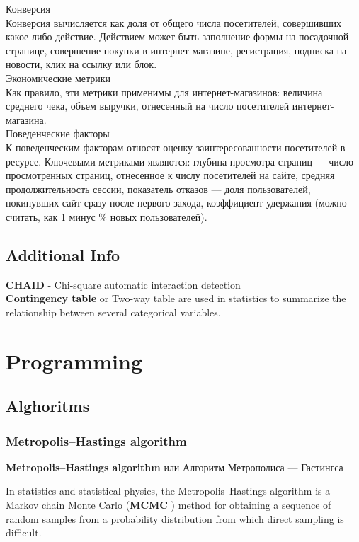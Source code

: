 \documentclass{book}
\begin{document}
Конверсия\\

Конверсия вычисляется как доля от общего числа посетителей, совершивших какое-либо действие. Действием может быть заполнение формы на посадочной странице, совершение покупки в интернет-магазине, регистрация, подписка на новости, клик на ссылку или блок.\\

Экономические метрики\\

Как правило, эти метрики применимы для интернет-магазинов: величина среднего чека, объем выручки, отнесенный на число посетителей интернет-магазина.\\

Поведенческие факторы\\

К поведенческим факторам относят оценку заинтересованности посетителей в ресурсе. Ключевыми метриками являются: глубина просмотра страниц — число просмотренных страниц, отнесенное к числу посетителей на сайте, средняя продолжительность сессии, показатель отказов — доля пользователей, покинувших сайт сразу после первого захода, коэффициент удержания (можно считать, как 1 минус \% новых пользователей).\\

\chapter{Additional Info}
\textbf{CHAID} - Chi-square automatic interaction detection\\
\textbf{Contingency table} or Two-way table are used in statistics to summarize the relationship between several categorical variables. \\


\part{Programming}
\chapter{Alghoritms}
\section{Metropolis–Hastings algorithm}
\textbf{Metropolis–Hastings algorithm} или Алгоритм Метрополиса — Гастингса

In statistics and statistical physics, the Metropolis–Hastings algorithm is a Markov chain Monte Carlo (\textbf{MCMC} ) method for obtaining a sequence of random samples from a probability distribution from which direct sampling is difficult.



\printindex
\end{document}
